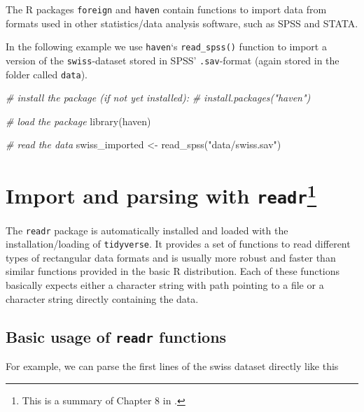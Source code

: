 \documentclass[
  12pt,
]{style/krantz}
\newenvironment{Shaded}{\begin{snugshade}}{\end{snugshade}}
\newcommand{\CommentTok}[1]{\textcolor[rgb]{0.56,0.35,0.01}{\textit{#1}}}
\newcommand{\FunctionTok}[1]{\textcolor[rgb]{0.00,0.00,0.00}{#1}}
\newcommand{\NormalTok}[1]{#1}
\newcommand{\OtherTok}[1]{\textcolor[rgb]{0.56,0.35,0.01}{#1}}
\newcommand{\StringTok}[1]{\textcolor[rgb]{0.31,0.60,0.02}{#1}}
\begin{document}
The R packages \texttt{foreign} and \texttt{haven} contain functions to import data from formats used in other statistics/data analysis software, such as SPSS and STATA.

In the following example we use \texttt{haven}`s \texttt{read\_spss()} function to import a version of the \texttt{swiss}-dataset stored in SPSS' \texttt{.sav}-format (again stored in the folder called \texttt{data}).

\begin{Shaded}
\begin{Highlighting}[]
\CommentTok{\# install the package (if not yet installed):}
\CommentTok{\# install.packages("haven")}

\CommentTok{\# load the package}
\FunctionTok{library}\NormalTok{(haven)}

\CommentTok{\# read the data}
\NormalTok{swiss\_imported }\OtherTok{\textless{}{-}} \FunctionTok{read\_spss}\NormalTok{(}\StringTok{"data/swiss.sav"}\NormalTok{)}
\end{Highlighting}
\end{Shaded}

\hypertarget{import-and-parsing-with-readr}{%
\section[Import and parsing with \texttt{readr}]{\texorpdfstring{Import and parsing with \texttt{readr}\footnote{This is a summary of Chapter 8 in \citet{wickham_grolemund2017}.}}{Import and parsing with readr}}\label{import-and-parsing-with-readr}}

The \texttt{readr} package is automatically installed and loaded with the installation/loading of \texttt{tidyverse}. It provides a set of functions to read different types of rectangular data formats and is usually more robust and faster than similar functions provided in the basic R distribution. Each of these functions basically expects either a character string with path pointing to a file or a character string directly containing the data.

\hypertarget{basic-usage-of-readr-functions}{%
\subsection{\texorpdfstring{Basic usage of \texttt{readr} functions}{Basic usage of readr functions}}\label{basic-usage-of-readr-functions}}

For example, we can parse the first lines of the swiss dataset directly like this
\end{document}
